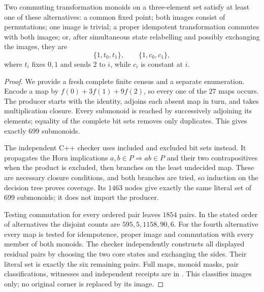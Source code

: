 \begin{lemma}
\label{CP2:A-three-state-images}
Two commuting transformation monoids on a three-element set
satisfy at least one of these alternatives: a common fixed
point; both images consist of permutations; one image is
trivial; a proper idempotent transformation commutes with
both images; or, after simultaneous state relabelling and
possibly exchanging the images, they are
\[
 \{1,t_0,t_1\},\qquad \{1,c_0,c_1\},
\]
where $t_i$ fixes $0,1$ and sends $2$ to $i$, while $c_i$
is constant at $i$.
\end{lemma}
\begin{proof}
We provide a fresh complete finite census and a separate
enumeration. Encode a map by $f(0)+3f(1)+9f(2)$, so every
one of the $27$ maps occurs. The producer
 starts with the identity,
adjoins each absent map in turn, and takes multiplication
closure. Every submonoid is reached by successively adjoining
its elements; equality of the complete bit sets removes only
duplicates. This gives exactly $699$ submonoids.

The independent C++ checker
 uses included and
excluded bit sets instead. It propagates the Horn implications
$a,b\in P\Rightarrow ab\in P$ and their two contrapositives
when the product is excluded, then branches on the least
undecided map. These are necessary closure conditions, and
both branches are tried, so induction on the decision tree
proves coverage. Its $1463$ nodes give exactly the same literal
set of $699$ submonoids; it does not import the producer.

Testing commutation for every ordered pair leaves $1854$
pairs. In the stated order of alternatives the disjoint counts
are $595,5,1158,90,6$. For the fourth alternative every map
is tested for idempotence, proper image and commutation with
every member of both monoids. The checker independently
constructs all displayed residual pairs by choosing the two
core states and exchanging the sides. Their literal set is
exactly the six remaining pairs. Full maps, monoid masks,
pair classifications, witnesses and independent receipts are
in . This classifies images
only; no original corner is replaced by its image.
\end{proof}

